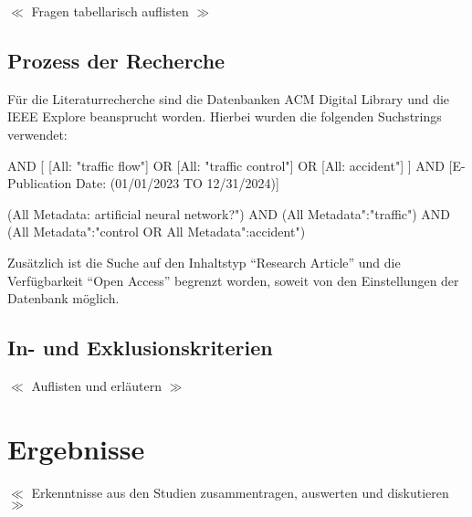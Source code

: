\documentclass{scrartcl}
\begin{document}
$\ll$ Fragen tabellarisch auflisten $\gg$

\subsection{Prozess der Recherche}

Für die Literaturrecherche sind die Datenbanken ACM Digital Library und die IEEE Explore
beansprucht worden. Hierbei wurden die folgenden Suchstrings verwendet:

\begin{tcolorbox}
   AND [
         [All: "traffic flow"]
         OR [All: "traffic control"]
         OR [All: \dq accident"]
      ]
   AND [E-Publication Date: (01/01/2023 TO 12/31/2024)]
\end{tcolorbox}

\begin{tcolorbox}[
      enhanced,
      attach boxed title to top left,
      colback=gray!20,
      colframe=gray,
      colbacktitle=gray,
      title=IEEE Explore,
      fonttitle=\bfseries\color{black},
      boxed title style={size=small, colframe=gray, sharp corners},
      sharp corners
   ]
   (\dq All Metadata\dq: \dq artificial neural network?")
   AND (\dq All Metadata":"traffic")
   AND (\dq All Metadata":"control\dq\space
   OR \dq All Metadata":\dq accident")
\end{tcolorbox}

Zusätzlich ist die Suche auf den Inhaltstyp \enquote{Research Article}
und die Verfügbarkeit \enquote{Open Access} begrenzt worden, soweit von
den Einstellungen der Datenbank möglich.

\subsection{In- und Exklusionskriterien}

$\ll$ Auflisten und erläutern $\gg$

\section{Ergebnisse}

$\ll$ Erkenntnisse aus den Studien zusammentragen, auswerten und diskutieren $\gg$
\end{document}
